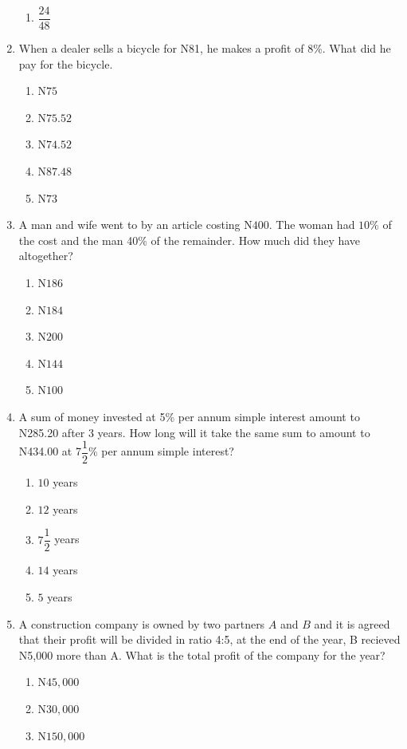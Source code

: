 \begin{multicols}{2}
\begin{enumerate}[label={\arabic*.}]
\begin{enumerate}[label={\Alph*.}]
    \item \(\dfrac{24}{48}\)
    \end{enumerate}
\item When a dealer sells a bicycle for N81, he makes a profit of 8\%. What did he pay for the bicycle. 
    \begin{enumerate}[label={\Alph*.}]
    \item N\(75\)
    \item N\(75.52\)
    \item N\(74.52\)
    \item N\(87.48\)
    \item N\(73\)
    \end{enumerate}
\item A man and wife went to by an article costing N\(400\). The woman had \(10\%\) of the cost and the man 40\% of the remainder. How much did they have altogether?
    \begin{enumerate}[label={\Alph*.}]
    \item N\(186\)
    \item N\(184\)
    \item N\(200\)
    \item N\(144\)
    \item N\(100\)
    \end{enumerate}
\item A sum of money invested at 5\% per annum simple interest amount to N285.20 after 3 years. How long will it take the same sum to amount to N434.00 at 7\(\dfrac{1}{2}\)\% per annum simple interest?
    \begin{enumerate}[label={\Alph*.}]
    \item \(10\) years
    \item \(12\) years
    \item \(7\dfrac{1}{2}\) years
    \item \(14\) years
    \item \(5\) years
    \end{enumerate}
\item A construction company is owned by two partners \(A\) and \(B\) and it is agreed that their profit will be divided in ratio 4:5, at the end of the year, B recieved N5,000 more than A. What is the total profit of the company for the year? 
    \begin{enumerate}[label={\Alph*.}]
    \item N\(45,000\)
    \item N\(30,000\)
    \item N\(150,000\)

\end{enumerate}
\end{enumerate}
\end{multicols}
